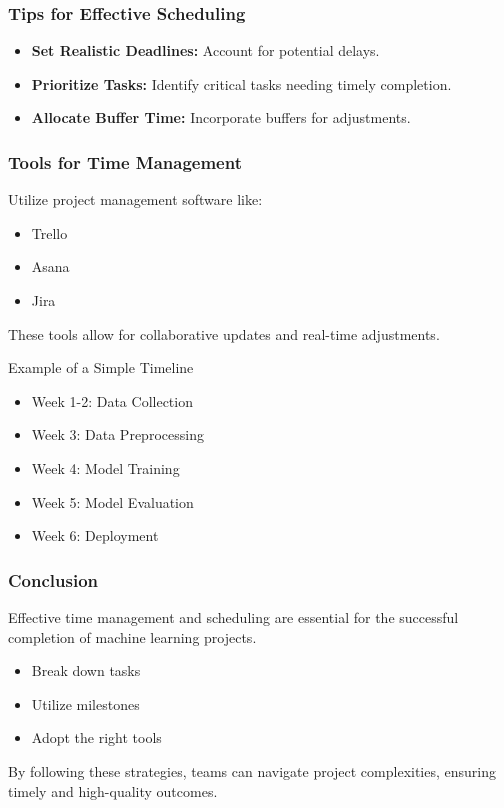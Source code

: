 \documentclass[aspectratio=169]{beamer}
\begin{document}
\begin{frame}[fragile]
    \frametitle{Tips for Effective Scheduling}
    \begin{itemize}
        \item \textbf{Set Realistic Deadlines:} Account for potential delays.
        \item \textbf{Prioritize Tasks:} Identify critical tasks needing timely completion.
        \item \textbf{Allocate Buffer Time:} Incorporate buffers for adjustments.
    \end{itemize}
\end{frame}

\begin{frame}[fragile]
    \frametitle{Tools for Time Management}
    Utilize project management software like:
    \begin{itemize}
        \item Trello
        \item Asana
        \item Jira
    \end{itemize}
    These tools allow for collaborative updates and real-time adjustments.

    \begin{block}{Example of a Simple Timeline}
        \begin{itemize}
            \item Week 1-2: Data Collection
            \item Week 3: Data Preprocessing
            \item Week 4: Model Training
            \item Week 5: Model Evaluation
            \item Week 6: Deployment
        \end{itemize}
    \end{block}
\end{frame}

\begin{frame}[fragile]
    \frametitle{Conclusion}
    Effective time management and scheduling are essential for the successful completion of machine learning projects. 
    \begin{itemize}
        \item Break down tasks
        \item Utilize milestones
        \item Adopt the right tools
    \end{itemize}
    By following these strategies, teams can navigate project complexities, ensuring timely and high-quality outcomes.
\end{frame}
\end{document}
